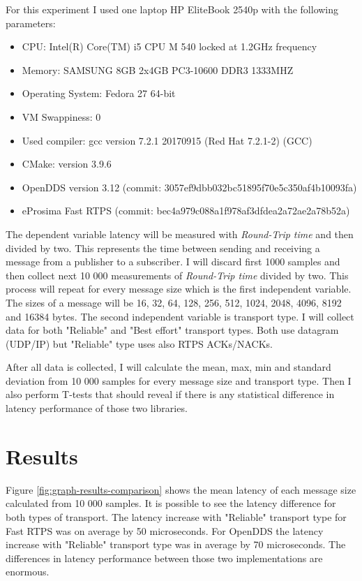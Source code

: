 \documentclass{csfourzero}
\begin{document}
For this experiment I used one laptop HP EliteBook 2540p with the following parameters: 

\begin{itemize}
	\item CPU: Intel(R) Core(TM) i5 CPU M 540 locked at 1.2GHz frequency
	\item Memory: SAMSUNG 8GB 2x4GB PC3-10600 DDR3 1333MHZ
	\item Operating System: Fedora 27 64-bit
	\item VM Swappiness: 0
	\item Used compiler: gcc version 7.2.1 20170915 (Red Hat 7.2.1-2) (GCC)
	\item CMake: version 3.9.6
	\item OpenDDS version 3.12 (commit: 3057ef9dbb032bc51895f70e5c350af4b10093fa) 
	\item eProsima Fast RTPS (commit: bec4a979c088a1f978af3dfdea2a72ae2a78b52a)
\end{itemize}

The dependent variable latency will be measured with \textit{Round-Trip time} and then divided by two. This represents the time between sending and receiving a message from a publisher to a subscriber. I will discard first 1000 samples and then collect next 10 000 measurements of \textit{Round-Trip time} divided by two. This process will repeat for every message size which is the first independent variable. The sizes of a message will be 16, 32, 64, 128, 256, 512, 1024, 2048, 4096, 8192 and 16384 bytes. The second independent variable is transport type. I will collect data for both "Reliable" and "Best effort" transport types. Both use datagram (UDP/IP) but "Reliable" type uses also RTPS ACKs/NACKs.

After all data is collected, I will calculate the mean, max, min and standard deviation from 10 000 samples for every message size and transport type. Then I also perform T-tests that should reveal if there is any statistical difference in latency performance of those two libraries.

\section{Results}
\label{sec:results}

\quad Figure \ref{fig:graph-results-comparison} shows the mean latency of each message size calculated from 10 000 samples. It is possible to see the latency difference for both types of transport. The latency increase with "Reliable" transport type for Fast RTPS was on average by 50 microseconds. For OpenDDS the latency increase with "Reliable" transport type was in average by 70 microseconds. The differences in latency performance between those two implementations are enormous.
\end{document}
